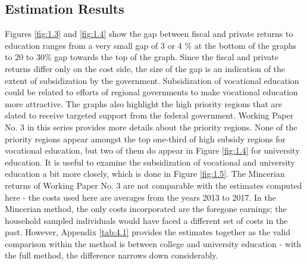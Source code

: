 \documentclass[alpha-refs]{wiley-article-05g}
\begin{document}
\vspace{-2em}

\subsection{Estimation Results} 

Figures \ref{fig:1.3} and \ref{fig:1.4} show the gap between fiscal and private returns to education ranges from a very small gap of 3 or 4 \% at the bottom of the graphs to 20 to 30\% gap towards the top of the graph. Since the fiscal and private returns differ only on the cost side, the size of the gap is an indication of the extent of subsidization by the government. Subsidization of vocational education could be related to efforts of regional governments to make vocational education more attractive. The graphs also highlight the high priority regions that are slated to receive targeted support from the federal government. Working Paper No. 3 in this series provides more details about the priority regions. None of the priority regions appear amongst the top one-third of high subsidy regions for vocational education, but two of them do appear in Figure \ref{fig:1.4} for university education. It is useful to examine the subsidization of vocational and university education a bit more closely, which is done in Figure \ref{fig:1.5}. The Mincerian returns of Working Paper No. 3 are not comparable with the estimates computed here - the costs used here are averages from the years 2013 to 2017. In the Mincerian method, the only costs incorporated are the foregone earnings; the household sampled individuals would have faced a different set of costs in the past. However, Appendix \ref{tab:4.1} provides the estimates together as the valid comparison within the method is between college and university education - with the full method, the difference narrows down considerably. 
\end{document}
